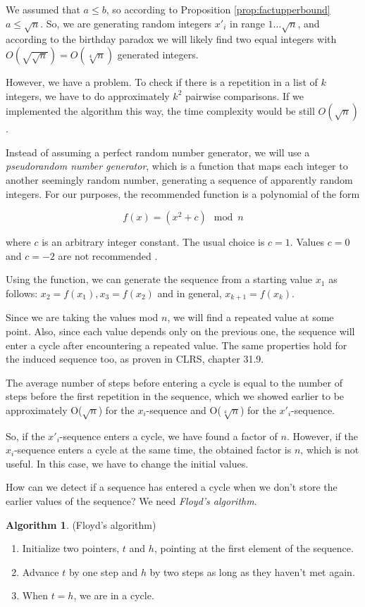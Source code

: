 \documentclass[12pt] {article}
\theoremstyle{plain}
\theoremstyle{definition}
\newtheorem{algo}[thm]{Algorithm}
\begin{document}
We assumed that $a \leq b$, so according to Proposition \ref{prop:factupperbound} $a \leq \sqrt{n}$. So, we are generating random integers $x'_i$ in range $1 \dots \sqrt{n}$, and according to the birthday paradox we will likely find two equal integers with $O(\sqrt{\sqrt{n}}) = O(\sqrt[4]{n})$ generated integers.

However, we have a problem. To check if there is a repetition in a list of $k$ integers, we have to do approximately $k^2$ pairwise comparisons. If we implemented the algorithm this way, the time complexity would be still $O(\sqrt{n})$.

Instead of assuming a perfect random number generator, we will use a \textit{pseudorandom number generator}, which is a function that maps each integer to another seemingly random number, generating a sequence of apparently random integers. For our purposes, the recommended function is a polynomial of the form

\[
	f(x) = (x^2 + c) \mod n
\]

where $c$ is an arbitrary integer constant. The usual choice is $c = 1$. Values $c = 0$ and $c = -2$ are not recommended \cite{pollard}.

Using the function, we can generate the sequence from a starting value $x_1$ as follows: $x_2 = f(x_1), x_3 = f(x_2)$ and in general, $x_{k+1} = f(x_k)$.

Since we are taking the values mod $n$, we will find a repeated value at some point. Also, since each value depends only on the previous one, the sequence will enter a cycle after encountering a repeated value. The same properties hold for the induced sequence too, as proven in CLRS\cite{clrs}, chapter 31.9.

The average number of steps before entering a cycle is equal to the number of steps before the first repetition in the sequence, which we showed earlier to be approximately O($\sqrt{n}$) for the $x_i$-sequence and O($\sqrt[4]{n}$) for the $x'_i$-sequence.

So, if the $x'_i$-sequence enters a cycle, we have found a factor of $n$. However, if the $x_i$-sequence enters a cycle at the same time, the obtained factor is $n$, which is not useful. In this case, we have to change the initial values.

How can we detect if a sequence has entered a cycle when we don't store the earlier values of the sequence? We need \textit{Floyd's algorithm}\cite{cphb}.

\begin{algo} (Floyd's algorithm)
\begin{enumerate}
\item Initialize two pointers, $t$ and $h$, pointing at the first element of the sequence.
\item Advance $t$ by one step and $h$ by two steps as long as they haven't met again.
\item When $t = h$, we are in a cycle.
\end{enumerate}
\end{algo}
\end{document}
